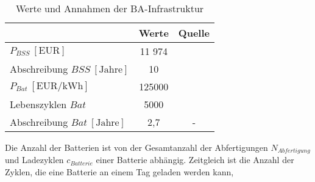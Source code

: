 %
%
%
%
%
\begin{table}[h]
	\begin{center}
    \caption{Werte und Annahmen der BA-Infrastruktur}
	\label{BA_Infrastrukturtab}
	\begin{tabular}{|l|c|c|}
		\hline
		 & \textbf{Werte} & \textbf{Quelle} \\ \hline
		$P_{BSS} ~[\text{EUR}]$ &  11 974  & \cite{guo2020aviation} \\ \hline
      Abschreibung $BSS ~[\text{Jahre}]$&  10  & \cite{salucci2020optimal} \\ \hline
		$P_{Bat} ~[\text{EUR/kWh}]$ & 125000 & \cite{guo2020aviation} \\ \hline
      Lebenszyklen $Bat$ & 5000 & \cite{reimers2018introduction} \\ \hline
      Abschreibung $Bat ~[\text{Jahre}]$& 2,7 & -\\ \hline
	\end{tabular}
    \end{center}
\end{table}
Die Anzahl der Batterien ist von der Gesamtanzahl der Abfertigungen $N_{Abfertigung}$ 
und Ladezyklen $c_{Batterie}$ einer Batterie abhängig. 
Zeitgleich ist die Anzahl der Zyklen, die eine Batterie an einem Tag geladen werden kann, 
